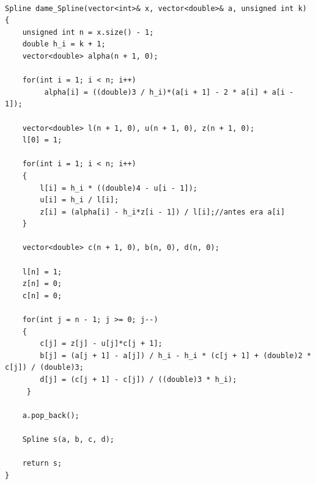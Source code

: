 \documentclass[a4paper]{article}
\begin{document}
\begin{verbatim}
    
Spline dame_Spline(vector<int>& x, vector<double>& a, unsigned int k)
{
    unsigned int n = x.size() - 1;
    double h_i = k + 1;
    vector<double> alpha(n + 1, 0);

    for(int i = 1; i < n; i++)
         alpha[i] = ((double)3 / h_i)*(a[i + 1] - 2 * a[i] + a[i - 1]);

    vector<double> l(n + 1, 0), u(n + 1, 0), z(n + 1, 0);
    l[0] = 1;

    for(int i = 1; i < n; i++)
    {
        l[i] = h_i * ((double)4 - u[i - 1]);
        u[i] = h_i / l[i];
        z[i] = (alpha[i] - h_i*z[i - 1]) / l[i];//antes era a[i]
    }

    vector<double> c(n + 1, 0), b(n, 0), d(n, 0);

    l[n] = 1;
    z[n] = 0;
    c[n] = 0;

    for(int j = n - 1; j >= 0; j--)
    {
        c[j] = z[j] - u[j]*c[j + 1];
        b[j] = (a[j + 1] - a[j]) / h_i - h_i * (c[j + 1] + (double)2 * c[j]) / (double)3;
        d[j] = (c[j + 1] - c[j]) / ((double)3 * h_i);
     }

    a.pop_back();

    Spline s(a, b, c, d);

    return s;
}

\end{verbatim}   
\end{document}
